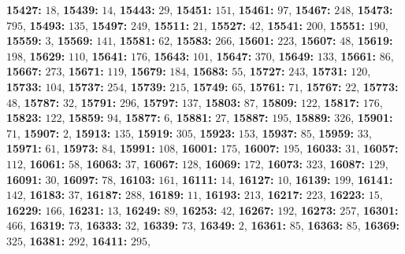 \textsf{\bfseries 15427:} $18$, \textsf{\bfseries 15439:} $14$, \textsf{\bfseries 15443:} $29$, \textsf{\bfseries 15451:} $151$, \textsf{\bfseries 15461:} $97$, \textsf{\bfseries 15467:} $248$, \textsf{\bfseries 15473:} $795$, \textsf{\bfseries 15493:} $135$, \textsf{\bfseries 15497:} $249$, \textsf{\bfseries 15511:} $21$, \textsf{\bfseries 15527:} $42$, \textsf{\bfseries 15541:} $200$, \textsf{\bfseries 15551:} $190$, \textsf{\bfseries 15559:} $3$, \textsf{\bfseries 15569:} $141$, \textsf{\bfseries 15581:} $62$, \textsf{\bfseries 15583:} $266$, \textsf{\bfseries 15601:} $223$, \textsf{\bfseries 15607:} $48$, \textsf{\bfseries 15619:} $198$, \textsf{\bfseries 15629:} $110$, \textsf{\bfseries 15641:} $176$, \textsf{\bfseries 15643:} $101$, \textsf{\bfseries 15647:} $370$, \textsf{\bfseries 15649:} $133$, \textsf{\bfseries 15661:} $86$, \textsf{\bfseries 15667:} $273$, \textsf{\bfseries 15671:} $119$, \textsf{\bfseries 15679:} $184$, \textsf{\bfseries 15683:} $55$, \textsf{\bfseries 15727:} $243$, \textsf{\bfseries 15731:} $120$, \textsf{\bfseries 15733:} $104$, \textsf{\bfseries 15737:} $254$, \textsf{\bfseries 15739:} $215$, \textsf{\bfseries 15749:} $65$, \textsf{\bfseries 15761:} $71$, \textsf{\bfseries 15767:} $22$, \textsf{\bfseries 15773:} $48$, \textsf{\bfseries 15787:} $32$, \textsf{\bfseries 15791:} $296$, \textsf{\bfseries 15797:} $137$, \textsf{\bfseries 15803:} $87$, \textsf{\bfseries 15809:} $122$, \textsf{\bfseries 15817:} $176$, \textsf{\bfseries 15823:} $122$, \textsf{\bfseries 15859:} $94$, \textsf{\bfseries 15877:} $6$, \textsf{\bfseries 15881:} $27$, \textsf{\bfseries 15887:} $195$, \textsf{\bfseries 15889:} $326$, \textsf{\bfseries 15901:} $71$, \textsf{\bfseries 15907:} $2$, \textsf{\bfseries 15913:} $135$, \textsf{\bfseries 15919:} $305$, \textsf{\bfseries 15923:} $153$, \textsf{\bfseries 15937:} $85$, \textsf{\bfseries 15959:} $33$, \textsf{\bfseries 15971:} $61$, \textsf{\bfseries 15973:} $84$, \textsf{\bfseries 15991:} $108$, \textsf{\bfseries 16001:} $175$, \textsf{\bfseries 16007:} $195$, \textsf{\bfseries 16033:} $31$, \textsf{\bfseries 16057:} $112$, \textsf{\bfseries 16061:} $58$, \textsf{\bfseries 16063:} $37$, \textsf{\bfseries 16067:} $128$, \textsf{\bfseries 16069:} $172$, \textsf{\bfseries 16073:} $323$, \textsf{\bfseries 16087:} $129$, \textsf{\bfseries 16091:} $30$, \textsf{\bfseries 16097:} $78$, \textsf{\bfseries 16103:} $161$, \textsf{\bfseries 16111:} $14$, \textsf{\bfseries 16127:} $10$, \textsf{\bfseries 16139:} $199$, \textsf{\bfseries 16141:} $142$, \textsf{\bfseries 16183:} $37$, \textsf{\bfseries 16187:} $288$, \textsf{\bfseries 16189:} $11$, \textsf{\bfseries 16193:} $213$, \textsf{\bfseries 16217:} $223$, \textsf{\bfseries 16223:} $15$, \textsf{\bfseries 16229:} $166$, \textsf{\bfseries 16231:} $13$, \textsf{\bfseries 16249:} $89$, \textsf{\bfseries 16253:} $42$, \textsf{\bfseries 16267:} $192$, \textsf{\bfseries 16273:} $257$, \textsf{\bfseries 16301:} $466$, \textsf{\bfseries 16319:} $73$, \textsf{\bfseries 16333:} $32$, \textsf{\bfseries 16339:} $73$, \textsf{\bfseries 16349:} $2$, \textsf{\bfseries 16361:} $85$, \textsf{\bfseries 16363:} $85$, \textsf{\bfseries 16369:} $325$, \textsf{\bfseries 16381:} $292$, \textsf{\bfseries 16411:} $295$, 
